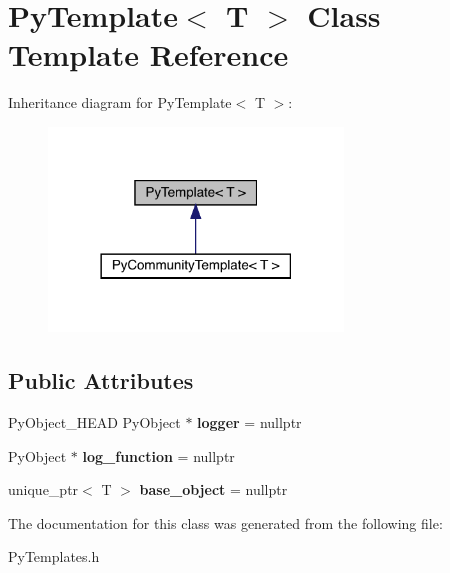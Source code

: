 \hypertarget{class_py_template}{}\section{Py\+Template$<$ T $>$ Class Template Reference}
\label{class_py_template}


Inheritance diagram for Py\+Template$<$ T $>$\+:
\nopagebreak
\begin{figure}[H]
\begin{center}
\leavevmode
\includegraphics[width=222pt]{class_py_template__inherit__graph}
\end{center}
\end{figure}
\subsection*{Public Attributes}
\begin{DoxyCompactItemize}
\item 
Py\+Object\+\_\+\+H\+E\+AD Py\+Object $\ast$ {\bfseries logger} = nullptr\hypertarget{class_py_template_a5b741a472639d65f9bcad29afa16ec99}{}\label{class_py_template_a5b741a472639d65f9bcad29afa16ec99}

\item 
Py\+Object $\ast$ {\bfseries log\+\_\+function} = nullptr\hypertarget{class_py_template_a98bb8152faa73d028342d5cf260f0372}{}\label{class_py_template_a98bb8152faa73d028342d5cf260f0372}

\item 
unique\+\_\+ptr$<$ T $>$ {\bfseries base\+\_\+object} = nullptr\hypertarget{class_py_template_a14da655e6d3c0b398d8478058316d326}{}\label{class_py_template_a14da655e6d3c0b398d8478058316d326}

\end{DoxyCompactItemize}


The documentation for this class was generated from the following file\+:\begin{DoxyCompactItemize}
\item 
Py\+Templates.\+h\end{DoxyCompactItemize}
